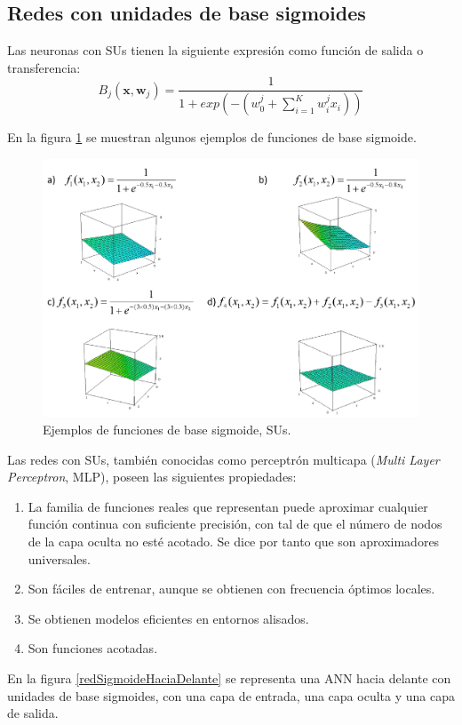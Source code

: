 \subsection{Redes con unidades de base sigmoides}\label{unidadesSigmoide}
\noindent Las neuronas con SUs tienen la siguiente expresión como
función de salida o transferencia:
\begin{displaymath}
	B_{j}\left(\mathbf{x},\mathbf{w}_{j}\right)=\frac{1}{1+exp\left(-\left(w_{0}
^j+\sum_{i=1}^{K} w_{i}^{j}x_{i} \right) \right)}
\end{displaymath}

En la figura \ref{ejemploSigmoides} se muestran algunos ejemplos de funciones de base
sigmoide.

\begin{figure}[htb]
\centering
\includegraphics[keepaspectratio,width=12.5cm]{figuras/ejemploSigmoides.jpg}
\caption{Ejemplos de funciones de base sigmoide, SUs.}
\label{ejemploSigmoides}
\end{figure}

Las redes con SUs, también conocidas como perceptrón multicapa (\textit{Multi Layer
Perceptron}, MLP), poseen las siguientes propiedades:
\begin{enumerate}
	\item La familia de funciones reales que representan puede aproximar cualquier función
	continua	con  suficiente  precisión,  con  tal  de  que  el  número  de  nodos  de  la
	capa	oculta  no  esté	acotado. Se dice por tanto que son aproximadores universales.
	\item Son fáciles de entrenar, aunque se obtienen con frecuencia óptimos locales.
	\item Se obtienen modelos eficientes en entornos alisados.
	\item Son funciones acotadas.
	\end{enumerate}
En la figura \ref{redSigmoideHaciaDelante} se representa una ANN hacia delante
con unidades de base sigmoides, con una capa de entrada, una capa oculta y una capa de
salida.

